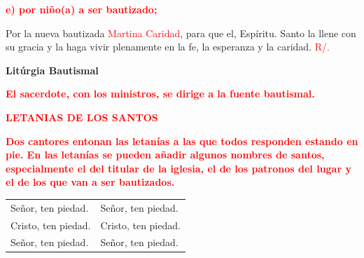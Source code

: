 \documentclass[12pt, letterpaper]{report}
\begin{document}
\large {\bfseries \textcolor{red}{e) por ni\~no(a) a ser bautizado;}} \newline

\Large Por la nueva bautizada  \textcolor{red}{Martina Caridad}, para que el, Esp\'iritu. Santo la llene con su gracia y la haga vivir plenamente en la fe, la esperanza y la caridad. \hspace{1cm} \textcolor{red}{R/.}

\newpage

\begin{center}
\Huge {\bfseries Lit\'urgia Bautismal}
\end{center}

\vspace{1cm}

\large {\bfseries \textcolor{red}{El sacerdote, con los ministros, se dirige a la fuente bautismal.}} \newline

\Large {\bfseries \textcolor{red}{LETANIAS DE LOS SANTOS}} \newline

\large {\bfseries \textcolor{red}{Dos cantores entonan las letan\'ias a las que todos responden estando en pie. En las letan\'ias se pueden a\~nadir algunos nombres de santos, especialmente el del titular de la iglesia, el de los patronos del lugar y el de los que van a ser bautizados.}} \newline

\begin{tabular}{ll}
Se\~nor, ten piedad.& Se\~nor, ten piedad.\\
Cristo, ten piedad.& Cristo, ten piedad. \\
Se\~nor, ten piedad.& Se\~nor, ten piedad.
\end{tabular} \newline \\
\end{document}
